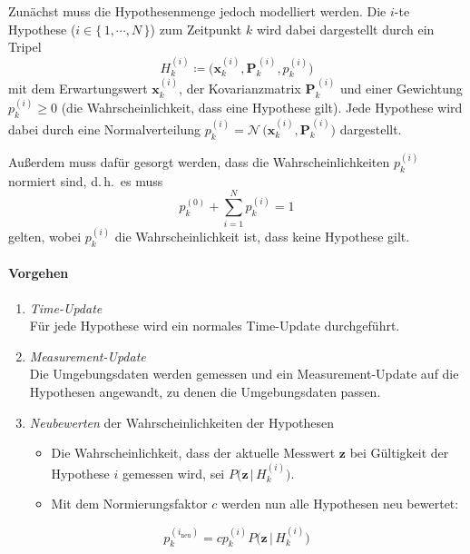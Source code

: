 \documentclass[a4paper, 11pt, accentcolor = tud3b]{tudreport}
\newcommand{\mat}[1]{\boldsymbol{#1}}
\renewcommand{\vec}[1]{\boldsymbol{#1}}
\renewcommand{\dh}{d.\,h.~}
\begin{document}
					Zunächst muss die Hypothesenmenge jedoch modelliert werden. Die \(i\)-te Hypothese (\( i \in \{\, 1, \cdots, N \,\} \)) zum Zeitpunkt \(k\) wird dabei dargestellt durch ein Tripel
					\begin{equation*}
						H_k^{(i)} \coloneqq \Big( \vec{x}_k^{(i)}, \mat{P}_k^{\,(i)}, p_k^{(i)} \Big)
					\end{equation*}
					mit dem Erwartungswert \( \vec{x}_k^{(i)} \), der Kovarianzmatrix \( \mat{P}_k^{\,(i)} \) und einer Gewichtung \( p_k^{(i)} \geq 0 \) (die Wahrscheinlichkeit, dass eine Hypothese gilt). Jede Hypothese wird dabei durch eine Normalverteilung \( p_k^{(i)} = \mathcal{N}\,\Big( \vec{x}_k^{(i)}, \mat{P}_k^{\,(i)} \Big) \) dargestellt.
					
					Außerdem muss dafür gesorgt werden, dass die Wahrscheinlichkeiten \( p_k^{(i)} \) normiert sind, \dh es muss
					\begin{equation*}
						p_k^{(0)} + \sum_{i = 1}^{N} p_k^{(i)} = 1
					\end{equation*}
					gelten, wobei \( p_k^{(i)} \) die Wahrscheinlichkeit ist, dass keine Hypothese gilt.
					
					\paragraph{Vorgehen}
						\begin{enumerate}
							\item \emph{Time-Update} \\ Für jede Hypothese wird ein normales Time-Update durchgeführt.
							\item \emph{Measurement-Update} \\ Die Umgebungsdaten werden gemessen und ein Measurement-Update auf die Hypothesen angewandt, zu denen die Umgebungsdaten passen.
							\item \emph{Neubewerten} der Wahrscheinlichkeiten der Hypothesen
								\begin{itemize}
									\item Die Wahrscheinlichkeit, dass der aktuelle Messwert \( \vec{z} \) bei Gültigkeit der Hypothese \( i \) gemessen wird, sei \( P\Big(\vec{z} \,\big\vert\, H_k^{(i)}\Big) \).
									\item Mit dem Normierungsfaktor \(c\) werden nun alle Hypothesen neu bewertet:
								\end{itemize}
						\end{enumerate}
						\begin{equation*}
							p_k^{(i_\text{neu})} = c p_k^{(i)} P\Big(\vec{z} \,\big\vert\, H_k^{(i)}\Big)
						\end{equation*}
						
\end{document}

